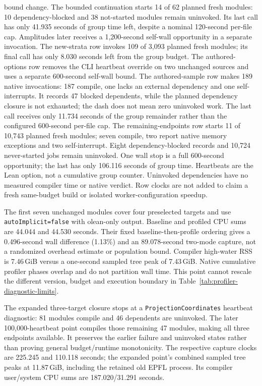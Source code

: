 \documentclass[10pt,twocolumn]{article}
\begin{document}
\begin{table}[t]
{bound change. The bounded continuation starts 14 of 62 planned fresh modules:
10 dependency-blocked and 38 not-started modules remain uninvoked.
Its last call has only 41.935 seconds of group time left, despite a nominal
120-second per-file cap. Amplitudes later receives a 1,200-second self-wall
opportunity in a separate invocation. The new-strata row invokes 109 of 3,093 planned
fresh modules; its final call has only 8.030 seconds left from the group budget.
The authored-options row removes the CLI heartbeat override on two unchanged
sources and uses a separate 600-second self-wall bound.
The authored-sample row makes 189 native invocations: 187 compile, one
lacks an external dependency and one self-interrupts. It records 47 blocked
dependents, while the planned dependency closure is not exhausted; the dash
does not mean zero uninvoked work. The last call receives only 11.734 seconds
of the group remainder rather than the configured 600-second per-file cap.
The remaining-endpoints row starts 11 of 10,743 planned fresh modules;
seven compile, two report native memory exceptions and two self-interrupt.
Eight dependency-blocked records and 10,724 never-started jobs remain
uninvoked. One wall stop is a full 600-second opportunity; the last has
only 106.116 seconds of group time.
Heartbeats are the Lean option, not a cumulative group counter.
Uninvoked dependencies have no measured compiler time or native verdict.
Row clocks are not added to claim a fresh same-budget build or isolated
worker-configuration speedup.}
\label{tab:modern-native-builds}
\end{table}

The first seven unchanged modules cover four preselected targets and use
\texttt{autoImplicit=false} with olean-only output. Baseline and profiled
CPU sums are 44.044 and 44.530 seconds. Their fixed baseline-then-profile
ordering gives a 0.496-second wall difference (1.13\%) and an 89.078-second
two-mode capture, not a randomized overhead estimate or population bound.
Compiler high-water RSS is 7.46\,GiB versus a one-second sampled tree peak
of 7.43\,GiB. Native cumulative profiler phases overlap and do not partition
wall time. This point cannot rescale the different version, budget and
execution boundary in Table~\ref{tab:profiler-diagnostic-limits}.

The expanded three-target closure stops at a \texttt{ProjectionCoordinates}
heartbeat diagnostic: 81 modules compile and 46 dependents are uninvoked.
The later 100,000-heartbeat point compiles those remaining 47 modules,
making all three endpoints available. It preserves the earlier failure
and uninvoked states rather than proving general budget/runtime monotonicity.
The respective capture clocks are 225.245 and 110.118 seconds; the expanded
point's combined sampled tree peaks at 11.87\,GiB, including the retained
old EPFL process. Its compiler user/system CPU sums are 187.020/31.291 seconds.
\end{document}
